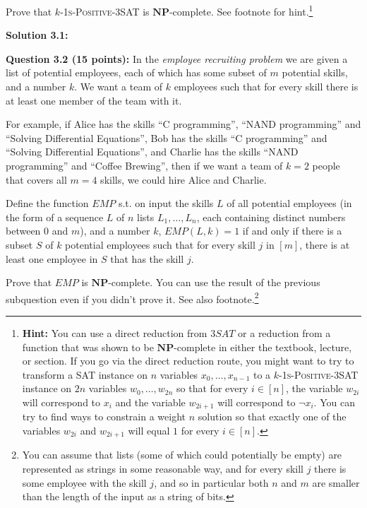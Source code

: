 \documentclass[11pt]{article}
\begin{document}
Prove that \textsc{$k$-1s-Positive-3SAT} is \(\mathbf{NP}\)-complete. See footnote for
hint.\footnote{\textbf{Hint:} You can use a direct reduction from
	\(3SAT\) or a reduction from a function that was shown to be
	\(\mathbf{NP}\)-complete in either the textbook, lecture, or section.
	If you go via the direct reduction route, you might want to try to
	transform a SAT instance on \(n\) variables \(x_0,\ldots,x_{n-1}\) to
	a \textsc{$k$-1s-Positive-3SAT} instance on \(2n\) variables \(w_0,\ldots,w_{2n}\) so that for
	every \(i\in [n]\), the variable \(w_{2i}\) will correspond to \(x_i\)
	and the variable \(w_{2i+1}\) will correspond to \(\neg x_i\). You can
	try to find ways to constrain a weight \(n\) solution so that exactly
	one of the variables \(w_{2i}\) and \(w_{2i+1}\) will equal \(1\) for
	every \(i \in [n]\).}

\textbf{Solution 3.1:}

\textbf{Question 3.2 (15 points):} In the \emph{employee recruiting
	problem} we are given a list of potential employees, each of which has
some subset of \(m\) potential skills, and a number \(k\). We want a team of \(k\) employees such that for every skill there is at least one member of the team with it.

For example, if Alice has the skills ``C programming'', ``NAND
programming'' and ``Solving Differential Equations'', Bob has the skills
``C programming'' and ``Solving Differential Equations'', and Charlie
has the skills ``NAND programming'' and ``Coffee Brewing'', then if we
want a team of $k=2$ people that covers all $m=4$ skills, we could hire
Alice and Charlie.

Define the function \(EMP\) s.t. on input the skills \(L\) of all
potential employees (in the form of a sequence \(L\) of \(n\) lists
\(L_1,\ldots,L_n\), each containing distinct numbers between \(0\) and
\(m\)), and a number \(k\), \(EMP(L,k)=1\) if and only if there is a
subset \(S\) of \(k\) potential employees such that for every skill
\(j\) in \([m]\), there is at least one employee in \(S\) that has the
skill \(j\).

Prove that \(EMP\) is \(\mathbf{NP}\)-complete. You can use the result
of the previous subquestion even if you didn't prove it. See also
footnote.\footnote{You can assume that lists (some of which could
	potentially be empty) are represented as strings in some reasonable
	way, and for every skill \(j\) there is some employee with the skill
	\(j\), and so in particular both \(n\) and \(m\) are smaller than the
	length of the input as a string of bits.}
\end{document}
